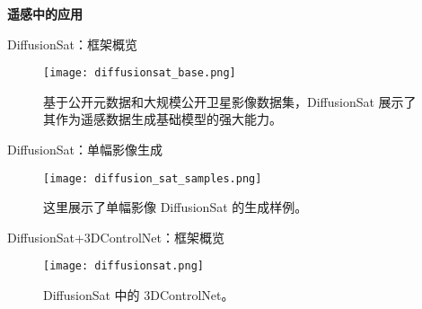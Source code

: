 \begin{refsection}
  \begin{frame}
    \centering
    \vspace{2.5cm}
    {\LARGE \textbf{遥感中的应用}}
  \end{frame}
\end{refsection}

\begin{refsection}
  \begin{frame}{DiffusionSat：框架概览}
    \begin{figure}
      \centering
      \texttt{[image: diffusionsat\_base.png]}
      \caption[]{\scriptsize 基于公开元数据和大规模公开卫星影像数据集，DiffusionSat 展示了其作为遥感数据生成基础模型的强大能力。~\parencite{diffusionset2024}}
    \end{figure}
    \bottomleftrefs
  \end{frame}
\end{refsection}

\begin{refsection}
  \begin{frame}{DiffusionSat：单幅影像生成}
    \begin{figure}
      \centering
      \texttt{[image: diffusion\_sat\_samples.png]}
      \caption[]{\scriptsize 这里展示了单幅影像 DiffusionSat 的生成样例。~\parencite{diffusionset2024}}
    \end{figure}
    \bottomleftrefs
  \end{frame}
\end{refsection}

\begin{refsection}
  \begin{frame}{DiffusionSat+3DControlNet：框架概览}
    \begin{figure}
      \centering
      \texttt{[image: diffusionsat.png]}
      \caption[]{\scriptsize DiffusionSat 中的 3DControlNet。~\parencite{diffusionset2024}}
    \end{figure}
    \bottomleftrefs
  \end{frame}
\end{refsection}

